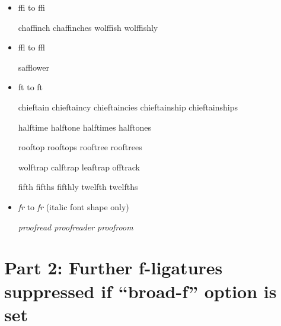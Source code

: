 \begin{itemize}
\item ffi to f\hspace{0pt}fi

chaffinch chaffinches wolffish wolffishly

\item ffl to f\hspace{0pt}fl

safflower



\item ft to f\hspace{0pt}t

chieftain chieftaincy chieftaincies chieftainship chieftainships

halftime halftone halftimes halftones

rooftop rooftops rooftree rooftrees

wolftrap calftrap leaftrap offtrack

fifth fifths fifthly twelfth twelfths



\item \emph{fr} to \emph{f\hspace{0pt}r} (italic font shape only)

\emph{proofread proofreader proofroom}



\end{itemize}

\section*{Part 2: Further f-ligatures suppressed if ``broad-f'' option is set}

